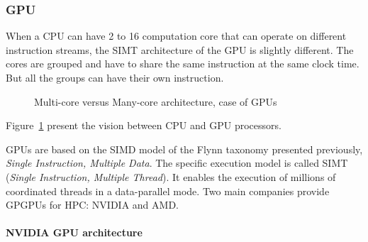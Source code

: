 \subsubsection{GPU}

When a CPU can have 2 to 16 computation core that can operate on different instruction streams, the SIMT architecture of the GPU is slightly different. 
The cores are grouped and have to share the same instruction at the same clock time. 
But all the groups can have their own instruction. 

\begin{figure}
\begin{center}
\hspace{1cm}
\end{center}
\caption{Multi-core versus Many-core architecture, case of GPUs}
\label{fig:2_HARD:gpu}
\end{figure}

Figure~\ref{fig:2_HARD:gpu} present the vision between CPU and GPU processors. 

GPUs are based on the SIMD model of the Flynn taxonomy presented previously, \emph{Single Instruction, Multiple Data}.
The specific execution model is called SIMT (\emph{Single Instruction, Multiple Thread}). It enables the execution of millions of coordinated threads in a data-parallel mode. 
Two main companies provide GPGPUs for  HPC: NVIDIA and AMD.

\paragraph{NVIDIA GPU architecture}

